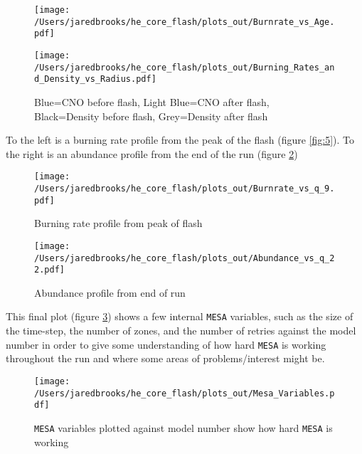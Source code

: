 \documentclass{article}
\begin{document}
        \begin{figure}[H]
          \begin{minipage}[b]{0.5\linewidth}
            \centering
            \texttt{[image: /Users/jaredbrooks/he\_core\_flash/plots\_out/Burnrate\_vs\_Age.pdf]}
            \caption{}
            \label{fig:3}
          \end{minipage}
          \hspace{0cm}
          \begin{minipage}[b]{0.5\linewidth}
            \centering
            \texttt{[image: /Users/jaredbrooks/he\_core\_flash/plots\_out/Burning\_Rates\_and\_Density\_vs\_Radius.pdf]}
            \caption{Blue=CNO before flash, Light Blue=CNO after flash, Black=Density before flash, Grey=Density after flash}
            \label{fig:4}
          \end{minipage}
        \end{figure}

        \pagebreak

        To the left is a burning rate profile from the peak of the flash (figure \ref{fig:5}).  To the right is an abundance profile from the end of the run (figure \ref{fig:6})

        \begin{figure}[H]
          \begin{minipage}[b]{0.5\linewidth}
            \centering
            \texttt{[image: /Users/jaredbrooks/he\_core\_flash/plots\_out/Burnrate\_vs\_q\_9.pdf]}
            \caption{Burning rate profile from peak of flash}
            \label{fig:5}
          \end{minipage}
          \hspace{0cm}
          \begin{minipage}[b]{0.5\linewidth}
            \centering
            \texttt{[image: /Users/jaredbrooks/he\_core\_flash/plots\_out/Abundance\_vs\_q\_22.pdf]}
            \caption{Abundance profile from end of run}
            \label{fig:6}
          \end{minipage}
        \end{figure}

        \pagebreak

        This final plot (figure \ref{fig:7}) shows a few internal \texttt{MESA} variables, such as the size of the time-step, the number of zones, and the number of retries against the model number in order to give some understanding of how hard \texttt{MESA} is working throughout the run and where some areas of problems/interest might be.

        \begin{figure}[H]
          \centering
          \texttt{[image: /Users/jaredbrooks/he\_core\_flash/plots\_out/Mesa\_Variables.pdf]}
          \caption{\texttt{MESA} variables plotted against model number show how hard \texttt{MESA} is working}
          \label{fig:7}
        \end{figure}
\end{document}
